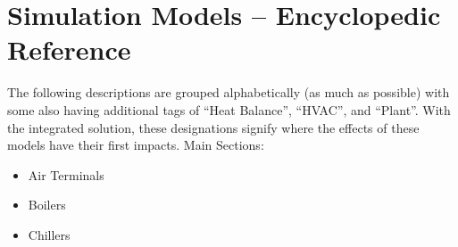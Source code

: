 \chapter{Simulation Models -- Encyclopedic Reference}\label{simulation-models---encyclopedic-reference}

The following descriptions are grouped alphabetically (as much as possible) with some also having additional tags of ``Heat Balance'', ``HVAC'', and ``Plant''. With the integrated solution, these designations signify where the effects of these models have their first impacts. Main Sections:

\begin{itemize}
  \item Air Terminals
  \item Boilers
  \item Chillers 
\end{itemize}
